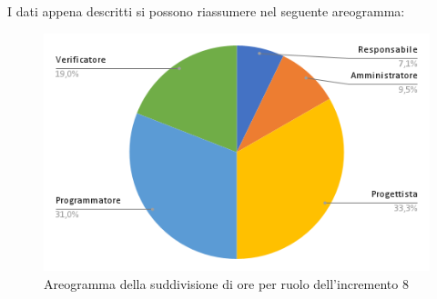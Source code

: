 \pagebreak
I dati appena descritti si possono riassumere nel seguente areogramma:
\begin{figure}[!h]
    \vspace{5px}
    \includegraphics[scale=0.5]{../../../Images/Diagrammi/Diagramma a torta/areogrammaIncremento8.png}
    \centering
    \caption{Areogramma della suddivisione di ore per ruolo dell'incremento 8}
\end{figure}

